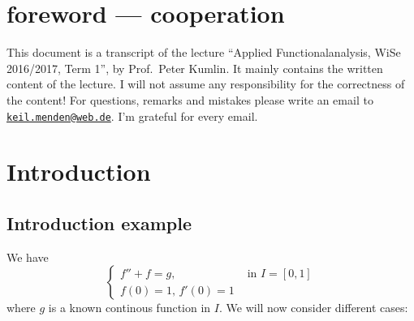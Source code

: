 
\newcommand{\Semester}{WiSe 2016/2017, Term 1}
\newcommand{\fach}{Applied Functionalanalysis}
\newcommand{\prof}{Prof.\ Peter Kumlin}






\maketitle
\cleardoubleoddemptypage

\section*{foreword --- cooperation}
This document is a transcript of the lecture \enquote{\fach, \Semester}, by \prof.
It mainly contains the written content of the lecture. I will not assume any responsibility for the correctness of the content! For questions, remarks and mistakes please write an email to \href{mailto:keil.menden@web.de}{\nolinkurl{keil.menden@web.de}}. I'm grateful for every email. 
\newpage

\newpage

\tableofcontents
\cleardoubleoddemptypage
{}
\setcounter{page}{1}

\section{Introduction}
\subsection{Introduction example} 
\label{sub:introduction_example}
We have
\[
	\begin{cases}
		f''+f =g, &\text{ in }I = [0,1]\\
		f(0)=1, \,f'(0)=1
	\end{cases}
\]
where $g$ is a known continous function in $I$. We will now consider different cases:

